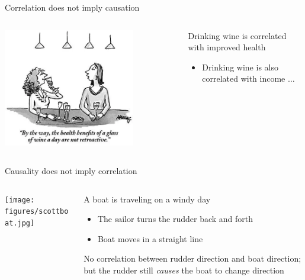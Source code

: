 \documentclass[aspectratio=169,t,11pt,table]{beamer}
\begin{document}
\begin{frame}{Correlation does not imply causation}
  \begin{columns}[T]
    \begin{column}{.6\textwidth}\vspace*{-\bigskipamount}
      \begin{center}
        \includegraphics[width = 0.75\textwidth]{figures/wine_and_health.png}
      \end{center}
    \end{column}
    \begin{column}{.4\textwidth}
      Drinking wine is correlated with improved health

      \begin{itemize}
        \item Drinking wine is also correlated with income $\dots$
      \end{itemize}
    \end{column}
  \end{columns}
\end{frame}

\begin{frame}{Causality does not imply correlation}
  \begin{columns}[T]
    \begin{column}{.6\textwidth}\vspace*{-\bigskipamount}
      \begin{center}
        \texttt{[image: figures/scottboat.jpg]}
      \end{center}
    \end{column}
    \begin{column}{.4\textwidth}
      A boat is traveling on a windy day
      \begin{itemize}
        \item The sailor turns the rudder back and forth
        \item Boat moves in a straight line
      \end{itemize}
      \bigskip
      No correlation between rudder direction and boat direction; but the rudder still \emph{causes} the boat to change direction
    \end{column}
  \end{columns}
\end{frame}
\end{document}
